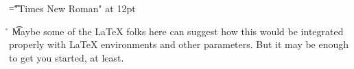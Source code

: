 \font\t="Times New Roman" at 12pt
 \r\n
\t Maybe some of the LaTeX folks here can suggest how this would be integrated properly with LaTeX environments and other parameters. But it may be enough to get you started, at least. 


\bye
